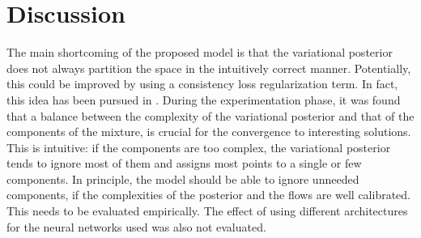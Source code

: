 \section{Discussion}

The main shortcoming of the proposed model is that the variational posterior does
not always partition the space in the intuitively correct manner. Potentially,
this could be improved by using a consistency loss regularization term. In fact,
this idea has been pursued in \autocite{semisuplearning_nflows}.
During the experimentation phase, it was found that a balance between the complexity of the variational
posterior and that of the components of the mixture, is crucial for the
convergence to interesting solutions. This is intuitive: if the components are
too complex, the variational posterior tends to ignore most of them and assigns
most points to a single or few components. In principle, the model should be
able to ignore unneeded components, if the complexities of the posterior and
the flows are well calibrated. This needs to be evaluated empirically.
The effect of using different architectures for the neural networks used
was also not evaluated.
